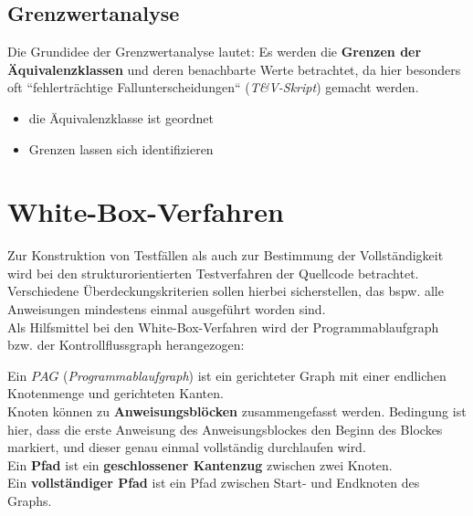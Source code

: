 \subsection*{Grenzwertanalyse}

Die Grundidee der Grenzwertanalyse lautet: Es werden die \textbf{Grenzen der Äquivalenzklassen} und deren benachbarte Werte betrachtet, da hier besonders oft ``fehlerträchtige Fallunterscheidungen`` (\textit{T\&V-Skript}) gemacht werden.

\vspace{5mm}
\begin{tcolorbox}[title={Vorraussetzungen für die Grenzwertanalyse}]
    \begin{itemize}
        \item die Äquivalenzklasse ist geordnet
        \item Grenzen lassen sich identifizieren
    \end{itemize}
\end{tcolorbox}

\section{White-Box-Verfahren}

Zur Konstruktion von Testfällen als auch zur Bestimmung der Vollständigkeit wird bei den strukturorientierten Testverfahren der Quellcode betrachtet.\\
Verschiedene Überdeckungskriterien sollen hierbei sicherstellen, das bspw. alle Anweisungen mindestens einmal ausgeführt worden sind.\\

\noindent
Als Hilfsmittel bei den White-Box-Verfahren wird der Programmablaufgraph bzw. der Kontrollflussgraph herangezogen:

\vspace{5mm}
\begin{tcolorbox}[title={Programmablaufgraph}]
    Ein $PAG$ (\textit{Programmablaufgraph}) ist ein gerichteter Graph mit einer endlichen Knotenmenge und gerichteten Kanten.\\

    \noindent
    Knoten können zu \textbf{Anweisungsblöcken} zusammengefasst werden.
    Bedingung ist hier, dass die erste Anweisung des Anweisungsblockes den Beginn des Blockes markiert, und dieser genau einmal vollständig durchlaufen wird.\\

    \noindent
    Ein \textbf{Pfad} ist ein \textbf{geschlossener Kantenzug} zwischen zwei Knoten.\\

    \noindent
    Ein \textbf{vollständiger Pfad} ist ein Pfad zwischen Start- und Endknoten des Graphs.
\end{tcolorbox}
\vspace{5mm}

